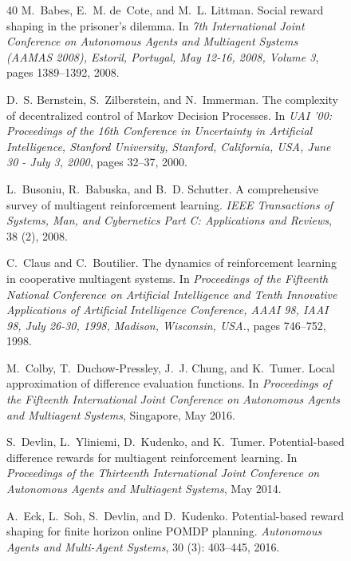 \documentclass{article}
\begin{document}
\begin{figure}
\begin{thebibliography}{40}
M.~Babes, E.~M. de~Cote, and M.~L. Littman.
\newblock Social reward shaping in the prisoner's dilemma.
\newblock In \emph{7th International Joint Conference on Autonomous Agents and
  Multiagent Systems {(AAMAS} 2008), Estoril, Portugal, May 12-16, 2008, Volume
  3}, pages 1389--1392, 2008.

D.~S. Bernstein, S.~Zilberstein, and N.~Immerman.
\newblock The complexity of decentralized control of {Markov Decision
  Processes}.
\newblock In \emph{{UAI} '00: Proceedings of the 16th Conference in Uncertainty
  in Artificial Intelligence, Stanford University, Stanford, California, USA,
  June 30 - July 3, 2000}, pages 32--37, 2000.

L.~Busoniu, R.~Babuska, and B.~D. Schutter.
\newblock A comprehensive survey of multiagent reinforcement learning.
\newblock \emph{IEEE Transactions of Systems, Man, and Cybernetics Part C:
  Applications and Reviews}, 38 (2), 2008.

C.~Claus and C.~Boutilier.
\newblock The dynamics of reinforcement learning in cooperative multiagent
  systems.
\newblock In \emph{Proceedings of the Fifteenth National Conference on
  Artificial Intelligence and Tenth Innovative Applications of Artificial
  Intelligence Conference, {AAAI} 98, {IAAI} 98, July 26-30, 1998, Madison,
  Wisconsin, {USA.}}, pages 746--752, 1998.

M.~Colby, T.~Duchow-Pressley, J.~J. Chung, and K.~Tumer.
\newblock Local approximation of difference evaluation functions.
\newblock In \emph{Proceedings of the Fifteenth International Joint Conference
  on Autonomous Agents and Multiagent Systems}, Singapore, May 2016.

S.~Devlin, L.~Yliniemi, D.~Kudenko, and K.~Tumer.
\newblock Potential-based difference rewards for multiagent reinforcement
  learning.
\newblock In \emph{Proceedings of the Thirteenth International Joint Conference
  on Autonomous Agents and Multiagent Systems}, May 2014.

A.~Eck, L.~Soh, S.~Devlin, and D.~Kudenko.
\newblock Potential-based reward shaping for finite horizon online {POMDP}
  planning.
\newblock \emph{Autonomous Agents and Multi-Agent Systems}, 30
  (3): 403--445, 2016.


\end{thebibliography}
\end{figure}
\end{document}
